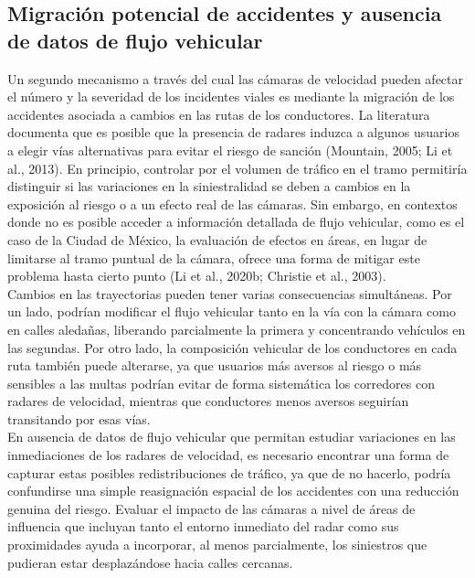 \subsection{Migración potencial de accidentes y ausencia de datos de flujo vehicular}
\noindent Un segundo mecanismo a través del cual las cámaras de velocidad pueden afectar el número y la severidad de los incidentes viales es mediante la migración de los accidentes asociada a cambios en las rutas de los conductores. La literatura documenta que es posible que la presencia de radares induzca a algunos usuarios a elegir vías alternativas para evitar el riesgo de sanción (Mountain, 2005; Li et al., 2013). En principio, controlar por el volumen de tráfico en el tramo permitiría distinguir si las variaciones en la siniestralidad se deben a cambios en la exposición al riesgo o a un efecto real de las cámaras. Sin embargo, en contextos donde no es posible acceder a información detallada de flujo vehicular, como es el caso de la Ciudad de México, la evaluación de efectos en áreas, en lugar de limitarse al tramo puntual de la cámara, ofrece una forma de mitigar este problema hasta cierto punto (Li et al., 2020b; Christie et al., 2003).\\

\indent Cambios en las trayectorias pueden tener varias consecuencias simultáneas. Por un lado, podrían modificar el flujo vehicular tanto en la vía con la cámara como en calles aledañas, liberando parcialmente la primera y concentrando vehículos en las segundas. Por otro lado, la composición vehicular de los conductores en cada ruta también puede alterarse, ya que usuarios más aversos al riesgo o más sensibles a las multas podrían evitar de forma sistemática los corredores con radares de velocidad, mientras que conductores menos aversos seguirían transitando por esas vías.\\

En ausencia de datos de flujo vehicular que permitan estudiar variaciones en las inmediaciones de los radares de velocidad, es necesario encontrar una forma de capturar estas posibles redistribuciones de tráfico, ya que de no hacerlo, podría confundirse una simple reasignación espacial de los accidentes con una reducción genuina del riesgo. Evaluar el impacto de las cámaras a nivel de áreas de influencia que incluyan tanto el entorno inmediato del radar como sus proximidades ayuda a incorporar, al menos parcialmente, los siniestros que pudieran estar desplazándose hacia calles cercanas.\\

